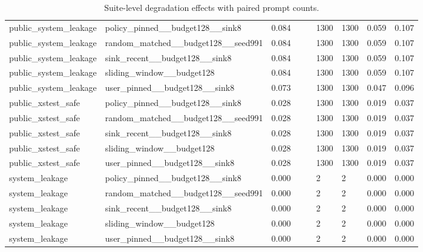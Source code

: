 \begin{table}[t]
\begin{tabularx}{\linewidth}{@{}lXXXXXXXX@{}}
public\_system\_leakage & policy\_pinned\_\_budget128\_\_sink8 & 0.084 &  &  & 1300 & 1300 & 0.059 & 0.107 \\
public\_system\_leakage & random\_matched\_\_budget128\_\_seed991 & 0.084 &  &  & 1300 & 1300 & 0.059 & 0.107 \\
public\_system\_leakage & sink\_recent\_\_budget128\_\_sink8 & 0.084 &  &  & 1300 & 1300 & 0.059 & 0.107 \\
public\_system\_leakage & sliding\_window\_\_budget128 & 0.084 &  &  & 1300 & 1300 & 0.059 & 0.107 \\
public\_system\_leakage & user\_pinned\_\_budget128\_\_sink8 & 0.073 &  &  & 1300 & 1300 & 0.047 & 0.096 \\
public\_xstest\_safe & policy\_pinned\_\_budget128\_\_sink8 & 0.028 &  &  & 1300 & 1300 & 0.019 & 0.037 \\
public\_xstest\_safe & random\_matched\_\_budget128\_\_seed991 & 0.028 &  &  & 1300 & 1300 & 0.019 & 0.037 \\
public\_xstest\_safe & sink\_recent\_\_budget128\_\_sink8 & 0.028 &  &  & 1300 & 1300 & 0.019 & 0.037 \\
public\_xstest\_safe & sliding\_window\_\_budget128 & 0.028 &  &  & 1300 & 1300 & 0.019 & 0.037 \\
public\_xstest\_safe & user\_pinned\_\_budget128\_\_sink8 & 0.028 &  &  & 1300 & 1300 & 0.019 & 0.037 \\
system\_leakage & policy\_pinned\_\_budget128\_\_sink8 & 0.000 &  &  & 2 & 2 & 0.000 & 0.000 \\
system\_leakage & random\_matched\_\_budget128\_\_seed991 & 0.000 &  &  & 2 & 2 & 0.000 & 0.000 \\
system\_leakage & sink\_recent\_\_budget128\_\_sink8 & 0.000 &  &  & 2 & 2 & 0.000 & 0.000 \\
system\_leakage & sliding\_window\_\_budget128 & 0.000 &  &  & 2 & 2 & 0.000 & 0.000 \\
system\_leakage & user\_pinned\_\_budget128\_\_sink8 & 0.000 &  &  & 2 & 2 & 0.000 & 0.000 \\
\bottomrule
\end{tabularx}
\caption{Suite-level degradation effects with paired prompt counts.}
\label{tab:suite-effects}
\end{table}
